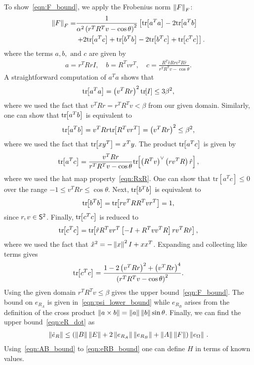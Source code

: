 To show~\cref{eqn:F_bound}, we apply the Frobenius norm \( \left\| F \right\|_F \):
\begin{align*}
	\left\| F \right\|_F =& \frac{1}{\alpha ^2 \left( r^T R^T v - \cos \theta \right)^2} \left[\mathrm{tr}\negthickspace\left[ a^T a \right] - 2 \mathrm{tr}\negthickspace\left[ a^T b \right] \right. \\
	&\left.+ 2 \mathrm{tr}\negthickspace\left[ a^T c  \right] + \mathrm{tr}\negthickspace\left[ b^T b \right]  - 2 \mathrm{tr}\negthickspace\left[ b^T c \right] + \mathrm{tr}\negthickspace\left[ c^T c \right]\right] .
\end{align*}
where the terms \( a, b, \text{ and } c \) are given by
\begin{gather*}
	a = r^T R r I , \quad	b = R^T v r^T , \quad c = \frac{R^T \hat{v} R r v^T R \hat{r}}{r^T R^T v - \cos \theta}.
\end{gather*}
A straightforward computation of \( a^T a \) shows that
\begin{gather*}
	\mathrm{tr}\negthickspace\left[ a^T a \right] = \left( v^T R r \right)^2 \mathrm{tr}\negthickspace\left[ I \right] \leq 3 \beta^2 ,
\end{gather*}
where we used the fact that \( v^T R r = r^T R^T v < \beta \) from our given domain.
Similarly, one can show that \( \mathrm{tr}\negthickspace\left[ a^T b \right] \) is equivalent to
\begin{gather*}
	\mathrm{tr}\negthickspace\left[ a^T b \right] = v^T R r \mathrm{tr}\negthickspace\left[ R^T v r^T \right] = \left( v^T R r \right)^2 \leq \beta^2 ,
\end{gather*} 
where we used the fact that \( \mathrm{tr}\negthickspace\left[ x y^T \right] = x^T y \).
The product \( \mathrm{tr}\negthickspace\left[ a^T c \right] \) is given by
\begin{gather*}
	\mathrm{tr}\negthickspace\left[ a^T c \right] = \frac{v^T R r}{r^T R^T v - \cos \theta} \mathrm{tr}\negthickspace\left[ \left( R^T v \right)^\vee \left( r v^T R \right) \hat{r}  \right] ,
\end{gather*}
where we used the hat map property~\cref{eqn:RxR}.
One can show that \(\mathrm{tr}[a^T c] \leq 0 \) over the range \( -1 \leq v^T R r \leq \cos \theta \). 
Next, \( \mathrm{tr}\negthickspace\left[ b^T b \right]\) is equivalent to
\begin{gather*}
	\mathrm{tr}\negthickspace\left[ b^T b \right] = \mathrm{tr}\negthickspace\left[ r v^T R R^T v r^T \right] = 1 ,
\end{gather*}
since \( r,v \in \mathsf{S}^2\).
Finally, \( \mathrm{tr}\negthickspace\left[ c^T c \right] \) is reduced to
\begin{gather*}
	\mathrm{tr}\negthickspace\left[ c^T c \right] = \mathrm{tr}\negthickspace\left[ \hat{r} R^T v r^T \left[ -I + R^T v v^T R \right] r v^T R \hat{r} \right] ,
\end{gather*}
where we used the fact that \( \hat{x}^2 = - \left\| x \right\|^2 I + x x^T\).
Expanding and collecting like terms gives
\begin{gather*}
	\mathrm{tr}\negthickspace\left[ c^T c  \right] = \frac{1 - 2\left( v^T R r \right)^2 + \left( v^T R r \right)^4}{\left( r^T R^T v - \cos \theta \right)^2} . 
\end{gather*}
Using the given domain \( r^T R^T v \leq \beta \) gives the upper bound~\cref{eqn:F_bound}.
The bound on \( e_{R_A} \) is given in~\cref{eqn:psi_lower_bound} while \( e_{R_B} \) arises from the definition of the cross product \( \left\| a \times b \right\| = \left\| a \right\| \left\| b \right\| \sin \theta \).
Finally, we can find the upper bound~\cref{eqn:eR_dot} as
\begin{gather*}
	\left\| \dot{e}_R \right\| \leq \left( \left\| B \right\| \left\| E \right\| + 2 \left\| e_{R_A} \right\| \left\| e_{R_B} \right\| + \left\| A \right\|\left\| F \right\| \right) \left\| e_\Omega \right\| \, .
\end{gather*}
Using~\cref{eqn:AB_bound} to \cref{eqn:eRB_bound} one can define \( H \) in terms of known values.

